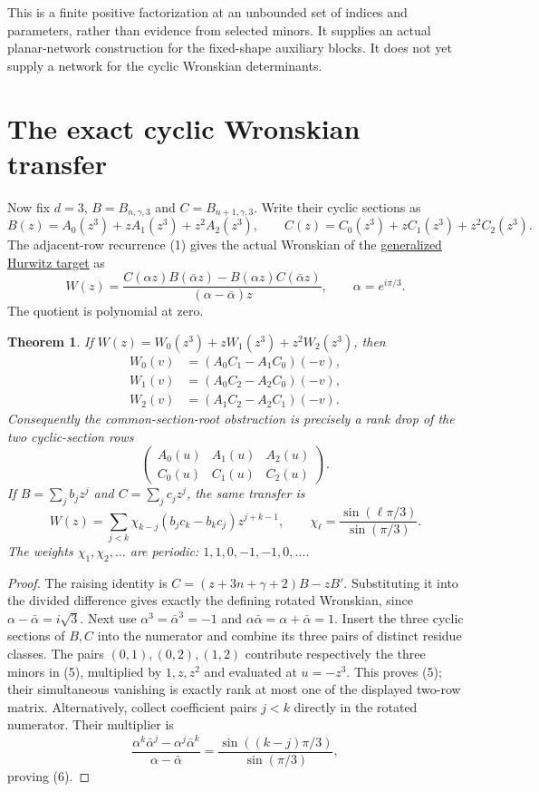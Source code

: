 \documentclass[11pt]{article}
\newtheorem{theorem}{Theorem}
\begin{document}
This is a finite positive factorization at an unbounded set of
indices and parameters, rather than evidence from selected minors.
It supplies an actual planar-network construction for the fixed-shape
auxiliary blocks. It does not yet supply a network for the cyclic
Wronskian determinants.

\section{The exact cyclic Wronskian transfer}
Now fix $d=3$, $B=B_{n,\gamma,3}$ and $C=B_{n+1,\gamma,3}$.
Write their cyclic sections as
\[
 B(z)=A_0(z^3)+zA_1(z^3)+z^2A_2(z^3),\qquad
 C(z)=C_0(z^3)+zC_1(z^3)+z^2C_2(z^3).
\]
The adjacent-row recurrence (1) gives the actual Wronskian of the
\href{gap_three_hurwitz.tex}{generalized Hurwitz target} as
\[
 W(z)=\frac{C(\alpha z)B(\bar\alpha z)-B(\alpha z)C(\bar\alpha z)}
              {(\alpha-\bar\alpha)z},\qquad \alpha=e^{i\pi/3}.
\]
The quotient is polynomial at zero.
\begin{theorem}\label{thm:transfer}
If $W(z)=W_0(z^3)+zW_1(z^3)+z^2W_2(z^3)$, then
\begin{align*}
 W_0(v)&=(A_0C_1-A_1C_0)(-v),\\
 W_1(v)&=(A_0C_2-A_2C_0)(-v),\\
 W_2(v)&=(A_1C_2-A_2C_1)(-v).                              \tag{5}
\end{align*}
Consequently the common-section-root obstruction is precisely a
rank drop of the two cyclic-section rows
\[
 \begin{pmatrix}A_0(u)&A_1(u)&A_2(u)\\C_0(u)&C_1(u)&C_2(u)\end{pmatrix}.
\]
If $B=\sum_j b_jz^j$ and $C=\sum_j c_jz^j$, the same transfer is
\[
 W(z)=\sum_{j<k}\chi_{k-j}(b_jc_k-b_kc_j)z^{j+k-1},\qquad
 \chi_\ell=\frac{\sin(\ell\pi/3)}{\sin(\pi/3)}.              \tag{6}
\]
The weights $\chi_1,\chi_2,\ldots$ are periodic:
$1,1,0,-1,-1,0,\ldots$.
\end{theorem}
\begin{proof}
The raising identity is $C=(z+3n+\gamma+2)B-zB'$.
Substituting it into the divided difference gives exactly the defining
rotated Wronskian, since $\alpha-\bar\alpha=i\sqrt3$.
Next use $\alpha^3=\bar\alpha^3=-1$ and
$\alpha\bar\alpha=\alpha+\bar\alpha=1$.
Insert the three cyclic sections of $B,C$ into the numerator and
combine its three pairs of distinct residue classes.
The pairs $(0,1),(0,2),(1,2)$ contribute respectively the three
minors in (5), multiplied by $1,z,z^2$ and evaluated at $u=-z^3$.
This proves (5); their simultaneous vanishing is exactly rank at
most one of the displayed two-row matrix.
Alternatively, collect coefficient pairs $j<k$ directly in the
rotated numerator. Their multiplier is
\[
 \frac{\alpha^k\bar\alpha^j-\alpha^j\bar\alpha^k}{\alpha-\bar\alpha}
       =\frac{\sin((k-j)\pi/3)}{\sin(\pi/3)},
\]
proving (6).
\end{proof}
\end{document}
